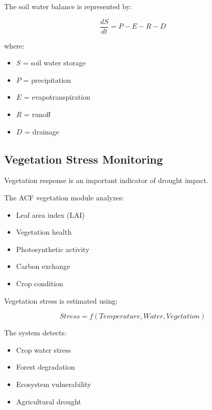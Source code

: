 The soil water balance is represented by:

\[
\frac{dS}{dt}
=
P-E-R-D
\]

where:

\begin{itemize}

\item $S$ = soil water storage

\item $P$ = precipitation

\item $E$ = evapotranspiration

\item $R$ = runoff

\item $D$ = drainage

\end{itemize}



\subsection{Vegetation Stress Monitoring}

Vegetation response is an important indicator of drought impact.

The ACF vegetation module analyzes:

\begin{itemize}

\item Leaf area index (LAI)

\item Vegetation health

\item Photosynthetic activity

\item Carbon exchange

\item Crop condition

\end{itemize}


Vegetation stress is estimated using:

\[
Stress=
f(Temperature,Water,Vegetation)
\]


The system detects:

\begin{itemize}

\item Crop water stress

\item Forest degradation

\item Ecosystem vulnerability

\item Agricultural drought

\end{itemize}


